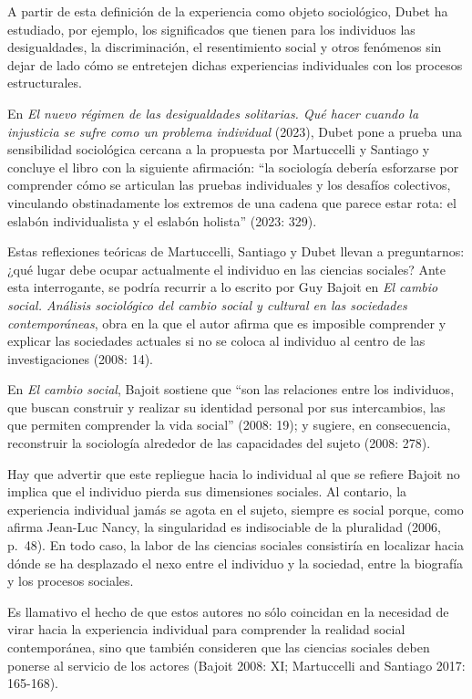 \documentclass[
]{interact}
\begin{document}
A partir de esta definición de la experiencia como objeto sociológico,
Dubet ha estudiado, por ejemplo, los significados que tienen para los
individuos las desigualdades, la discriminación, el resentimiento social
y otros fenómenos sin dejar de lado cómo se entretejen dichas
experiencias individuales con los procesos estructurales.

En \emph{El nuevo régimen de las desigualdades solitarias. Qué hacer
cuando la injusticia se sufre como un problema individual} (2023), Dubet
pone a prueba una sensibilidad sociológica cercana a la propuesta por
Martuccelli y Santiago y concluye el libro con la siguiente afirmación:
``la sociología debería esforzarse por comprender cómo se articulan las
pruebas individuales y los desafíos colectivos, vinculando
obstinadamente los extremos de una cadena que parece estar rota: el
eslabón individualista y el eslabón holista'' (2023: 329).

Estas reflexiones teóricas de Martuccelli, Santiago y Dubet llevan a
preguntarnos: ¿qué lugar debe ocupar actualmente el individuo en las
ciencias sociales? Ante esta interrogante, se podría recurrir a lo
escrito por Guy Bajoit en \emph{El cambio social. Análisis sociológico
del cambio social y cultural en las sociedades contemporáneas}, obra en
la que el autor afirma que es imposible comprender y explicar las
sociedades actuales si no se coloca al individuo al centro de las
investigaciones (2008: 14).

En \emph{El cambio social}, Bajoit sostiene que ``son las relaciones
entre los individuos, que buscan construir y realizar su identidad
personal por sus intercambios, las que permiten comprender la vida
social'' (2008: 19); y sugiere, en consecuencia, reconstruir la
sociología alrededor de las capacidades del sujeto (2008: 278).

Hay que advertir que este repliegue hacia lo individual al que se
refiere Bajoit no implica que el individuo pierda sus dimensiones
sociales. Al contario, la experiencia individual jamás se agota en el
sujeto, siempre es social porque, como afirma Jean-Luc Nancy, la
singularidad es indisociable de la pluralidad (2006, p.~48). En todo
caso, la labor de las ciencias sociales consistiría en localizar hacia
dónde se ha desplazado el nexo entre el individuo y la sociedad, entre
la biografía y los procesos sociales.

Es llamativo el hecho de que estos autores no sólo coincidan en la
necesidad de virar hacia la experiencia individual para comprender la
realidad social contemporánea, sino que también consideren que las
ciencias sociales deben ponerse al servicio de los actores (Bajoit 2008:
XI; Martuccelli and Santiago 2017: 165-168).
\end{document}
